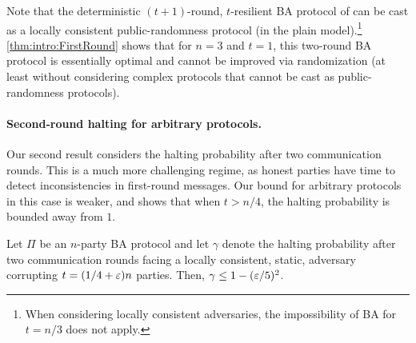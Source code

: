 Note that the deterministic $(t+1)$-round, $t$-resilient BA protocol of \citet{DS83} can be cast as a locally consistent public-randomness protocol (in the plain model).\footnote{When considering locally consistent adversaries, the impossibility of BA for $t=n/3$ does not apply.}
\cref{thm:intro:FirstRound} shows that for $n=3$ and $t=1$, this two-round BA protocol is essentially optimal and cannot be improved via randomization (at least without considering complex protocols that cannot be cast as public-randomness protocols).


\paragraph{Second-round halting for arbitrary protocols.}
Our second result considers the halting probability after two communication rounds.
This is a much more challenging regime, as honest parties have time to detect inconsistencies in first-round messages. Our bound for arbitrary protocols in this case is weaker, and shows that when $t>n/4$, the halting probability is bounded away from $1$.

\begin{theorem}\label{thm:intro:SecondRound:Arb}
 Let $\Pi$ be an $n$-party BA protocol and let $\gamma$ denote the halting probability after two communication rounds facing a locally consistent, static, adversary  corrupting $t=(1/4+\varepsilon)n$ parties.
Then, $\gamma \le 1 - (\varepsilon /5)^2$.
\end{theorem}

